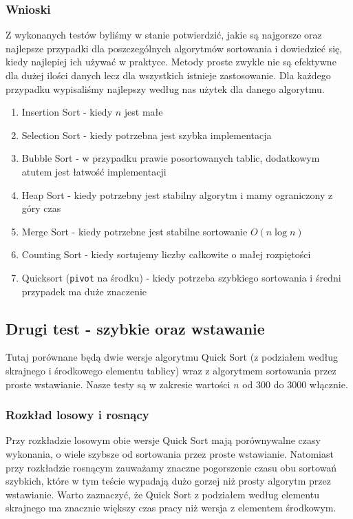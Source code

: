 \documentclass{article}
\begin{document}
\subsubsection{Wnioski}

Z wykonanych testów byliśmy w stanie potwierdzić, jakie są najgorsze oraz najlepsze przypadki dla poszczególnych algorytmów sortowania i dowiedzieć się, kiedy najlepiej ich używać w praktyce. Metody proste zwykle nie są efektywne dla dużej ilości danych lecz dla wszystkich istnieje zastosowanie. Dla każdego przypadku wypisaliśmy najlepszy według nas użytek dla danego algorytmu.

\begin{enumerate}
	\item Insertion Sort - kiedy $n$ jest małe
	\item Selection Sort - kiedy potrzebna jest szybka implementacja
	\item Bubble Sort - w przypadku prawie posortowanych tablic, dodatkowym atutem jest łatwość implementacji
	\item Heap Sort - kiedy potrzebny jest stabilny algorytm i mamy ograniczony z góry czas
	\item Merge Sort - kiedy potrzebne jest stabilne sortowanie $O(n\log n)$
	\item Counting Sort - kiedy sortujemy liczby całkowite o małej rozpiętości
	\item Quicksort (\verb+pivot+ na środku) - kiedy potrzeba szybkiego sortowania i średni przypadek ma duże znaczenie

\end{enumerate}

\subsection{Drugi test - szybkie oraz wstawanie}

Tutaj porównane będą dwie wersje algorytmu Quick Sort (z podziałem według skrajnego i środkowego elementu tablicy) wraz z algorytmem sortowania przez proste wstawianie. Nasze testy są w zakresie wartości $n$ od 300 do 3000 włącznie.

\subsubsection{Rozkład losowy i rosnący}

Przy rozkładzie losowym obie wersje Quick Sort mają porównywalne czasy wykonania, o wiele szybsze od sortowania przez proste wstawianie. Natomiast przy rozkładzie rosnącym zauważamy znaczne pogorszenie czasu obu sortowań szybkich, które w tym teście wypadają dużo gorzej niż prosty algorytm przez wstawianie. Warto zaznaczyć, że Quick Sort z podziałem według elementu skrajnego ma znacznie większy czas pracy niż wersja z elementem środkowym.
\end{document}
